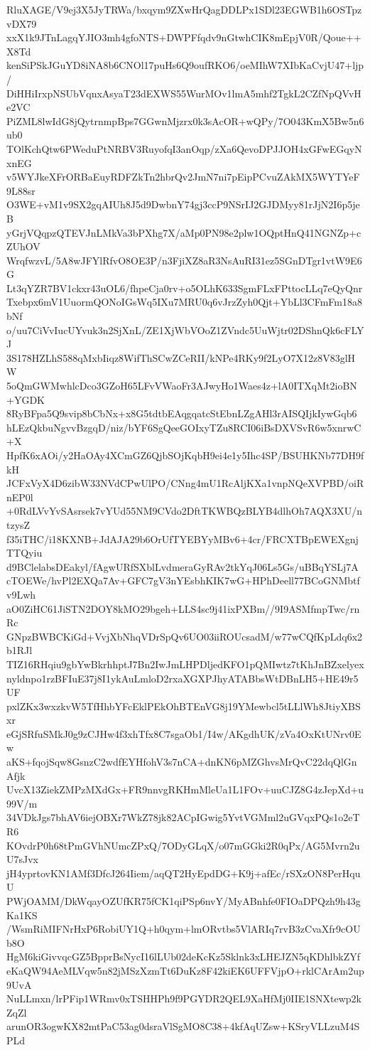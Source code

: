 RluXAGE/V9ej3X5JyTRWa/bxqym9ZXwHrQagDDLPx1SDl23EGWB1h6OSTpzvDX79
xxX1k9JTnLagqYJIO3mh4gfoNTS+DWPFfqdv9nGtwhCIK8mEpjV0R/Qoue++X8Td
kenSiPSkJGuYD8iNA8b6CNOl17puHs6Q9oufRKO6/oeMIhW7XIbKaCvjU47+ljp/
DiHHiIrxpNSUbVqnxAsyaT23dEXWS55WurMOv1lmA5mhf2TgkL2CZfNpQVvHe2VC
PiZML8lwIdG8jQytrnmpBps7GGwnMjzrx0k3sAcOR+wQPy/7O043KmX5Bw5n6ub0
TOlKchQtw6PWeduPtNRBV3RuyofqI3anOqp/zXa6QevoDPJJOH4xGFwEGqyNxnEG
v5WYJkeXFrORBaEuyRDFZkTn2hbrQv2JmN7ni7pEipPCvuZAkMX5WYTYeF9L88sr
O3WE+vM1v9SX2gqAIUh8J5d9DwbnY74gj3ccP9NSrIJ2GJDMyy81rJjN2I6p5jeB
yGrjVQqpzQTEVJnLMkVa3bPXhg7X/aMp0PN98e2plw1OQptHnQ41NGNZp+cZUhOV
WrqfwzvL/5A8wJFYlRfvO8OE3P/n3FjiXZ8aR3NsAuRI31ez5SGnDTgr1vtW9E6G
Lt3qYZR7BV1ckxr43uOL6/fhpeCja0rv+o5OLhK633SgmFLxFPttocLLq7eQyQnr
Txebpx6mV1UuormQONoIGsWq5IXu7MRU0q6vJrzZyh0Qjt+YbLl3CFmFm18a8bNf
o/uu7CiVvIucUYvuk3n2SjXnL/ZE1XjWbVOoZ1ZVndc5UuWjtr02DShnQk6cFLYJ
3S178HZLhS588qMxbIiqz8WifThSCwZCeRII/kNPe4RKy9f2LyO7X12z8V83glHW
5oQmGWMwhlcDco3GZoH65LFvVWaoFr3AJwyHo1Waes4z+lA0ITXqMt2ioBN+YGDK
8RyBFpa5Q9svip8bCbNx+x8G5tdtbEAqgqatcStEbnLZgAHl3rAISQIjkIywGqb6
hLEzQkbuNgvvBzgqD/niz/bYF6SgQeeGOIxyTZu8RCI06iBsDXVSvR6w5xnrwC+X
HpfK6xAOi/y2HaOAy4XCmGZ6QjbSOjKqbH9ei4e1y5Ihc4SP/BSUHKNb77DH9fkH
JCFxVyX4D6zibW33NVdCPwUlPO/CNng4mU1RcAljKXa1vnpNQeXVPBD/oiRnEP0l
+0RdLVvYvSAsrsek7vYUd55NM9CVdo2DftTKWBQzBLYB4dlhOh7AQX3XU/ntzysZ
f35iTHC/i18KXNB+JdAJA29b6OrUfTYEBYyMBv6+4cr/FRCXTBpEWEXgnjTTQyiu
d9BClelabsDEakyl/fAgwURfSXblLvdmeraGyRAv2tkYqJ06Ls5Gs/uBBqYSLj7A
cTOEWe/hvPl2EXQa7Av+GFC7gV3nYEsbhKIK7wG+HPhDeell77BCoGNMbtfv9Lwh
aO0ZiHC61JiSTN2DOY8kMO29bgeh+LLS4sc9j41ixPXBm//9I9ASMfmpTwc/rnRc
GNpzBWBCKiGd+VvjXbNhqVDrSpQv6UO03iiROUcsadM/w77wCQfKpLdq6x2b1RJl
TIZ16RHqiu9gbYwBkrhhptJ7Bn2IwJmLHPDljedKFO1pQMIwtz7tKhJnBZxelyex
nyldnpo1rzBFIuE37j8I1ykAuLmloD2rxaXGXPJhyATABbsWtDBnLH5+HE49r5UF
pxlZKx3wxzkvW5TfHhbYFcEklPEkOhBTEnVG8j19YMewbcl5tLLlWh8JtiyXBSxr
eGjSRfuSMkJ0g9zCJHw4f3xhTfx8C7sgaOb1/I4w/AKgdhUK/zVa4OxKtUNrv0Ew
aKS+fqojSqw8GsnzC2wdfEYHfohV3s7nCA+dnKN6pMZGhvsMrQvC22dqQlGnAfjk
UvcX13ZiekZMPzMXdGx+FR9nnvgRKHmMleUa1L1FOv+uuCJZ8G4zJepXd+u99V/m
34VDkJgs7bhAV6iejOBXr7WkZ78jk82ACpIGwig5YvtVGMml2uGVqxPQs1o2eTR6
KOvdrP0h68tPmGVhNUmcZPxQ/7ODyGLqX/o07mGGki2R0qPx/AG5Mvrn2uU7sJvx
jH4yprtovKN1AMf3DfcJ264Iiem/aqQT2HyEpdDG+K9j+afEc/rSXzON8PerHquU
PWjOAMM/DkWqayOZUfKR75fCK1qiPSp6nvY/MyABnhfe0FIOaDPQzh9h43gKa1KS
/WsmRiMIFNrHxP6RobiUY1Q+h0qym+lmORvtbs5VlARIq7rvB3zCvaXfr9cOUb8O
HgM6kiGivvqcGZ5BpprBsNycI16lLUb02deKcKz5Sklnk3xLHEJZN5qKDhlbkZYf
eKaQW94AeMLVqw5n82jMSzXzmTt6DuKz8F42kiEK6UFFVjpO+rklCArAm2up9UvA
NuLLmxn/lrPFip1WRmv0xTSHHPh9f9PGYDR2QEL9XaHfMj0IIE1SNXtewp2kZqZl
arunOR3ogwKX82mtPaC53ag0dsraVlSgMO8C38+4kfAqUZsw+KSryVLLzuM4SPLd
